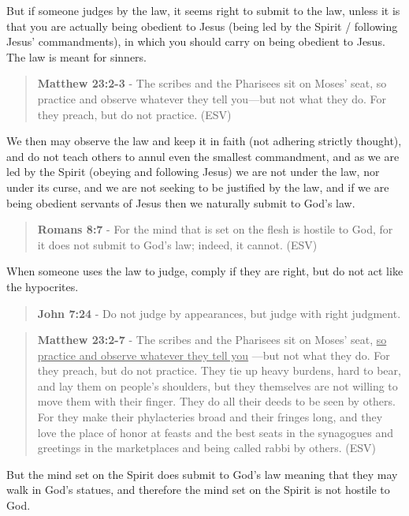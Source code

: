 \documentclass[11pt]{article}
\begin{document}
But if someone judges by the law, it seems right to submit to the law, unless it is that you are actually being obedient to Jesus (being led by the Spirit / following Jesus' commandments), in which you should carry on being obedient to Jesus. The law is meant for sinners.

\begin{quote}
\textbf{Matthew 23:2-3} - The scribes and the Pharisees sit on Moses' seat, so practice and observe whatever they tell you—but not what they do. For they preach, but do not practice. (ESV)
\end{quote}

We then may observe the law and keep it in faith (not adhering strictly thought), and do not teach others to annul even the smallest commandment, and as we are led by the Spirit (obeying and following Jesus) we are not under the law, nor under its curse, and we are not seeking to be justified by the law, and if we are being obedient servants of Jesus then we naturally submit to God's law.

\begin{quote}
\textbf{Romans 8:7} - For the mind that is set on the flesh is hostile to God, for it does not submit to God's law; indeed, it cannot. (ESV)
\end{quote}

When someone uses the law to judge, comply if they are right, but do not act like the hypocrites.

\begin{quote}
\textbf{John 7:24} - Do not judge by appearances, but judge with right judgment.
\end{quote}

\begin{quote}
\textbf{Matthew 23:2-7} - The scribes and the Pharisees sit on Moses' seat, \uline{so practice and observe whatever they tell you} —but not what they do. For they preach, but do not practice. They tie up heavy burdens, hard to bear, and lay them on people's shoulders, but they themselves are not willing to move them with their finger. They do all their deeds to be seen by others. For they make their phylacteries broad and their fringes long, and they love the place of honor at feasts and the best seats in the synagogues and greetings in the marketplaces and being called rabbi by others. (ESV)
\end{quote}

But the mind set on the Spirit does submit to God's law meaning that they may walk in God's statues, and therefore the mind set on the Spirit is not hostile to God.
\end{document}
